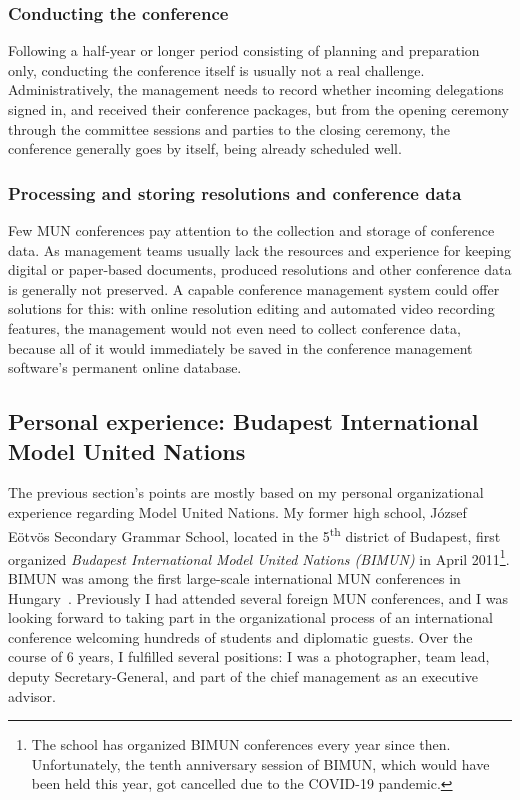 \subsubsection{Conducting the conference}

Following a half-year or longer period consisting of planning and preparation only, conducting the conference itself is usually not a real challenge. Administratively, the management needs to record whether incoming delegations signed in, and received their conference packages, but from the opening ceremony through the committee sessions and parties to the closing ceremony, the conference generally goes by itself, being already scheduled well.

\subsubsection{Processing and storing resolutions and conference data}

Few MUN conferences pay attention to the collection and storage of conference data. As management teams usually lack the resources and experience for keeping digital or paper-based documents, produced resolutions and other conference data is generally not preserved. A capable conference management system could offer solutions for this: with online resolution editing and automated video recording features, the management would not even need to collect conference data, because all of it would immediately be saved in the conference management software's permanent online database.

\subsection{Personal experience: Budapest International Model United Nations}
\label{section:personalexperience}

The previous section's points are mostly based on my personal organizational experience regarding Model United Nations. My former high school, József Eötvös Secondary Grammar School, located in the 5\textsuperscript{th} district of Budapest, first organized \emph{Budapest International Model United Nations (BIMUN)} in April 2011\footnote{The school has organized BIMUN conferences every year since then. Unfortunately, the tenth anniversary session of BIMUN, which would have been held this year, got cancelled due to the COVID-19 pandemic.}. BIMUN was among the first large-scale international MUN conferences in Hungary~\cite{bimunhistory}. Previously I had attended several foreign MUN conferences, and I was looking forward to taking part in the organizational process of an international conference welcoming hundreds of students and diplomatic guests. Over the course of 6 years, I fulfilled several positions: I was a photographer, team lead, deputy Secretary-General, and part of the chief management as an executive advisor.

